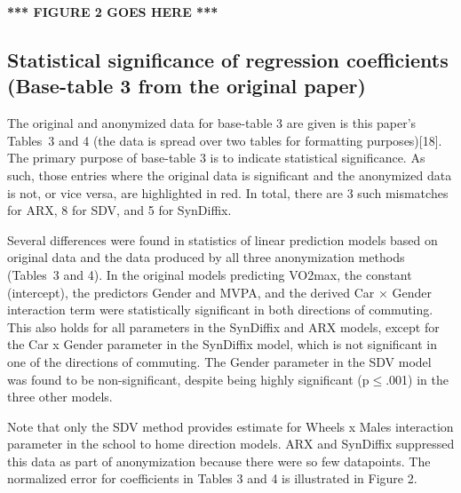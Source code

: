 \documentclass[10pt]{article}
\newcommand{\mycite}[1]{[#1]}
\begin{document}

\textbf{*** FIGURE 2 GOES HERE ***}

\subsection*{Statistical significance of regression coefficients (Base-table 3 from the original paper)}

The original and anonymized data for base-table 3 are given is this paper's Tables~3 and 4 (the data is spread over two tables for formatting purposes)\mycite{18}. The primary purpose of base-table 3 is to indicate statistical significance. As such, those entries where the original data is significant and the anonymized data is not, or vice versa, are highlighted in red. In total, there are 3 such mismatches for ARX, 8 for SDV, and 5 for SynDiffix.

Several differences were found in statistics of linear prediction models based on original data and the data produced by all three anonymization methods (Tables~3 and 4). In the original models predicting VO2max, the constant (intercept), the predictors Gender and MVPA, and the derived Car × Gender interaction term were statistically significant in both directions of commuting. This also holds for all parameters in the SynDiffix and ARX models, except for the Car x Gender parameter in the SynDiffix model, which is not significant in one of the directions of commuting. The Gender parameter in the SDV model was found to be non-significant, despite being highly significant (p$\leq$.001) in the three other models.

Note that only the SDV method provides estimate for Wheels x Males interaction parameter in the school to home direction models. ARX and SynDiffix suppressed this data as part of anonymization because there were so few datapoints.
%
The normalized error for coefficients in Tables 3 and 4 is illustrated in Figure 2.
\end{document}
